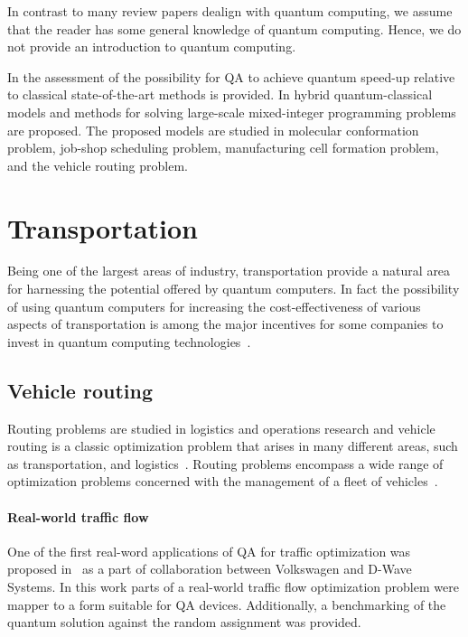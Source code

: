 \documentclass[a4paper,11pt]{article}
\begin{document}
In contrast to many review papers dealign with quantum computing, we assume that the reader has some general knowledge of quantum computing. Hence, we do not provide an introduction to quantum computing.

In \cite{crosson2021prospects} the assessment of the possibility for QA to 
achieve quantum speed-up relative to classical state-of-the-art methods is provided. In \cite{ajagekar2020quantum} hybrid quantum-classical models and methods for solving large-scale mixed-integer programming problems are proposed. The proposed models are studied in molecular conformation problem, job-shop scheduling problem, manufacturing cell formation
problem, and the vehicle routing problem.




\section{Transportation}

Being one of the largest areas of industry, transportation provide a natural area for harnessing the potential offered by quantum computers. In fact the possibility of using quantum computers for increasing the cost-effectiveness of various aspects of transportation is among the major incentives for some companies to invest in quantum computing technologies~\cite{bentley2022quantum, cooper2022exploring}.

\subsection{Vehicle routing}

Routing problems are studied in logistics and operations research and 
vehicle routing is a classic optimization problem that arises in many different areas, such as transportation, and logistics~\cite{dantzig1959truck,toth2002vehicle}. Routing problems encompass a wide range of optimization problems concerned with the management of a fleet of vehicles~\cite{harwood2021formulating}. 

\paragraph{Real-world traffic flow} One of the first real-word applications of QA for traffic optimization was proposed in~\cite{neukart2017traffic} as a part of collaboration between Volkswagen and D-Wave Systems. In this work parts of a real-world traffic flow optimization problem were mapper to a form suitable for QA devices. Additionally, a benchmarking of the quantum solution against the random assignment was provided.
\end{document}
